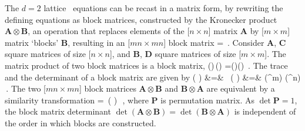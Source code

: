 \bigskip\bigskip

The $d=2$ lattice \catlatt\ equations can be recast in a
matrix form, by rewriting the defining equations as block
matrices, constructed by the
 {Kronecker
product} $\mathbf{A}\otimes\mathbf{B}$,%
an operation that replaces
elements of the [$n\times{n}$] matrix $\mathbf{A}$ by [$m\times{m}$]
matrix `blocks' $\mathbf{B}$, resulting in an [$mn\times mn$] block
matrix
\beq
{}\otimes{} =
\,.
Consider $\mathbf{A}$, $\mathbf{C}$ square matrices of size
[$n\times{n}$], and $\mathbf{B}$, $\mathbf{D}$ square matrices of size
[$m\times{m}$].
The matrix product of two block matrices is a block
matrix,
\beq
(\otimes{})\,(\otimes{})
  =()\otimes ()
  \,.
The trace and the determinant of a block matrix are given by
\bea
\tr( \otimes {})
    &=& \tr{}\,\tr{}
    \continue
\det\left( \otimes {}\right)
    &=& \det\left(^{m}\right) \det\left(^{n}\right)
\,.
\label{wikiKron2}
\eea
The two [$mn\times mn$] block matrices $\mathbf{A}\otimes\mathbf{B}$ and
$\mathbf{B}\otimes\mathbf{A}$ are equivalent by a similarity
transformation
\beq
{} \otimes {}
= \,( \otimes {} )\,
\,,
where $\mathbf{P}$ is permutation matrix. As $\det{\mathbf{P}}=1$,
the block matrix determinant
$\det\left(\mathbf{A}\otimes\mathbf{B}\right)
=
\det\left(\mathbf{B}\otimes\mathbf{A}\right)$
is independent of the order in which blocks are constructed.

